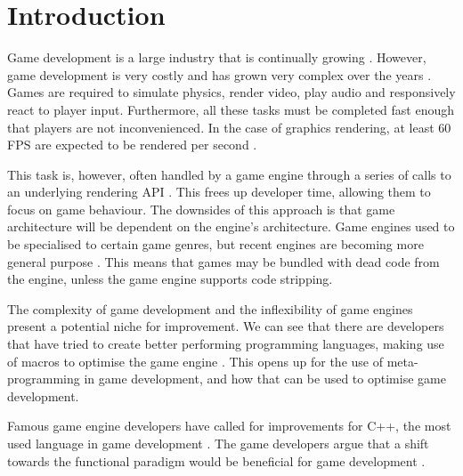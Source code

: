 \chapter{Introduction}
Game development is a large industry that is continually growing \cite{newzoo-games-market}.  However, game development is very costly and has grown very complex over the years \cite{blow2004game}. Games are required to simulate physics, render video, play audio and responsively react to player input. Furthermore, all these tasks must be completed fast enough that players are not inconvenienced. In the case of graphics rendering, at least 60 \ac{FPS} are expected to be rendered per second \cite{blow2004game}.

This task is, however, often handled by a game engine through a series of calls to an underlying rendering API \cite{ampatzoglou2007evaluation}. This frees up developer time, allowing them to focus on game behaviour. The downsides of this approach is that game architecture will be dependent on the engine's architecture. Game engines used to be specialised to certain game genres, but recent engines are becoming more general purpose \cite{messaoudi2015dissecting}. This means that games may be bundled with dead code from the engine, unless the game engine supports code stripping. 

The complexity of game development and the inflexibility of game engines present a potential niche for improvement. 
We can see that there are developers that have tried to create better performing programming languages, making use of macros to optimise the game engine \cite{blowProgrammingLanguage}. This opens up for the use of meta-programming in game development, and how that can be used to optimise game development.

Famous game engine developers have called for improvements for C++, the most used language in game development \cite{gamasutra:mostUsedProgrammingLanguage}. The game developers argue that a shift towards the functional  paradigm would be beneficial for game development \cite{gamasutra:c++functional, theNextMainstreanProgrammingLanguage}.


